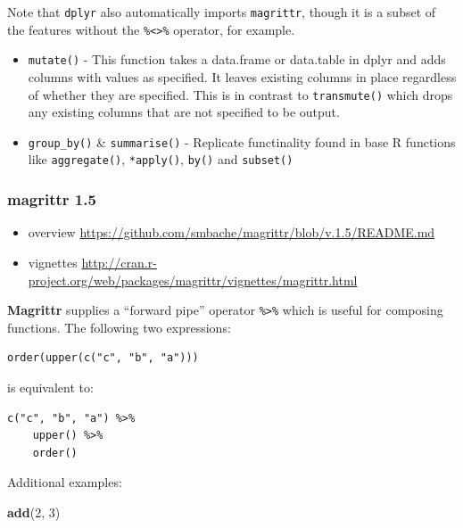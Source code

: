 \documentclass[]{article}
\newenvironment{Shaded}{\begin{snugshade}}{\end{snugshade}}
\newcommand{\KeywordTok}[1]{\textcolor[rgb]{0.13,0.29,0.53}{\textbf{{#1}}}}
\newcommand{\DecValTok}[1]{\textcolor[rgb]{0.00,0.00,0.81}{{#1}}}
\newcommand{\NormalTok}[1]{{#1}}
\begin{document}
Note that \texttt{dplyr} also automatically imports \texttt{magrittr},
though it is a subset of the features without the
\texttt{\%\textless{}\textgreater{}\%} operator, for example.

\begin{itemize}
\item
  \texttt{mutate()} - This function takes a data.frame or data.table in
  dplyr and adds columns with values as specified. It leaves existing
  columns in place regardless of whether they are specified. This is in
  contrast to \texttt{transmute()} which drops any existing columns that
  are not specified to be output.
\item
  \texttt{group\_by()} \& \texttt{summarise()} - Replicate functinality
  found in base R functions like \texttt{aggregate()},
  \texttt{*apply()}, \texttt{by()} and \texttt{subset()}
\end{itemize}

\subsubsection{magrittr 1.5}\label{magrittr-1.5}

\begin{itemize}
\itemsep1pt\parskip0pt
\item
  overview
  \url{https://github.com/smbache/magrittr/blob/v.1.5/README.md}
\item
  vignettes
  \url{http://cran.r-project.org/web/packages/magrittr/vignettes/magrittr.html}
\end{itemize}

\textbf{Magrittr} supplies a ``forward pipe'' operator
\texttt{\%\textgreater{}\%} which is useful for composing functions. The
following two expressions:

\begin{verbatim}
order(upper(c("c", "b", "a")))
\end{verbatim}

is equivalent to:

\begin{verbatim}
c("c", "b", "a") %>%
    upper() %>%
    order()
\end{verbatim}

Additional examples:

\begin{Shaded}
\begin{Highlighting}[]
\KeywordTok{add}\NormalTok{(}\DecValTok{2}\NormalTok{, }\DecValTok{3}\NormalTok{)}
\end{Highlighting}
\end{Shaded}
\end{document}
